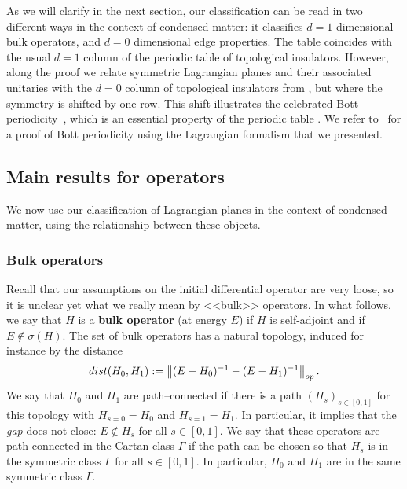 \documentclass[11pt]{amsart}
\numberwithin{equation}{section} %
\newcommand\1{{\mathds 1}}
\begin{document}
\medskip

As we will clarify in the next section, our classification can be read in two different ways in the context of condensed matter: it classifies $d = 1$ dimensional bulk operators, and $d = 0$ dimensional edge properties. The table coincides with the usual $d=1$ column of the periodic table of topological insulators. However, along the proof we relate symmetric Lagrangian planes and their associated unitaries with the $d=0$ column of topological insulators from \cite{GonMonPer-22}, but where the symmetry is shifted by one row. This shift illustrates the celebrated Bott periodicity~\cite{Bot-56,Bot-56a}, which is an essential property of the periodic table \cite{RyuSchFur-10}. We refer to~\cite{Gir-25} for a proof of Bott periodicity using the Lagrangian formalism that we presented.


\subsection{Main results for operators}
\label{sec:intro:junction}

We now use our classification of Lagrangian planes in the context of condensed matter, using the relationship between these objects.

\subsubsection{Bulk operators}
Recall that our assumptions on the initial differential operator are very loose, so it is unclear yet what we really mean by <<bulk>> operators. In what follows, we say that $H$ is a {\bf bulk operator} (at energy $E$) if $H$ is self-adjoint and if $E \notin \sigma(H)$. The set of bulk operators has a natural topology, induced for instance by the distance
\[
    {\rm dist}(H_0, H_1) := \left\| (E - H_0)^{-1} - (E - H_1)^{-1} \right\|_{\rm op}.
\]
We say that $H_0$ and $H_1$ are path--connected if there is a path $(H_s)_{s \in [0, 1]}$ for this topology with $H_{s = 0} = H_0$ and $H_{s = 1} = H_1$. In particular, it implies that the {\em gap} does not close: $E \notin H_s$ for all $s \in [0, 1]$. We say that these operators are path connected in the Cartan class $\Gamma$ if the path can be chosen so that $H_s$ is in the symmetric class $\Gamma$ for all $s \in [0, 1]$. In particular, $H_0$ and $H_1$ are in the same symmetric class $\Gamma$.

\medskip
\end{document}
